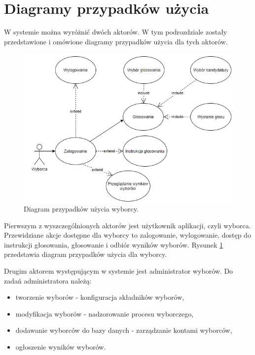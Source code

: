 \documentclass[a4paper,12pt]{book}
\begin{document}
\newpage

\section{Diagramy przypadków użycia}

W systemie można wyróżnić dwóch aktorów. W tym podrozdziale zostały przedstawione i omówione diagramy przypadków użycia dla tych aktorów.

\begin{figure}[h]
	\centering
	\includegraphics[width=\textwidth]{images/user_use_case.jpg}
	\caption{Diagram przypadków użycia wyborcy.}\label{user-use}
\end {figure}

Pierwszym z wyszczególnionych aktorów jest użytkownik aplikacji, czyli wyborca. Przewidziane akcje dostępne dla wyborcy to zalogowanie, wylogowanie, dostęp do instrukcji głosowania, głosowanie i odbiór wyników wyborów. Rysunek \ref{user-use} przedstawia diagram przypadków użycia dla wyborcy.

Drugim aktorem występującym w systemie jest administrator wyborów. Do zadań administratora należą: 

\begin{itemize}
	\item tworzenie wyborów - konfiguracja składników wyborów,
	\item modyfikacja wyborów - nadzorowanie procesu wyborczego,
	\item dodawanie wyborców do bazy danych - zarządzanie kontami wyborców,
	\item ogłoszenie wyników wyborów.
\end{itemize}
\end{document}
